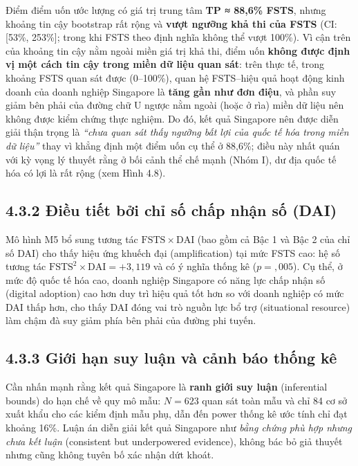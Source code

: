 \documentclass[
  a4paper,
  13pt]{extreport}
\begin{document}
Điểm điểm uốn ước lượng có giá trị trung tâm \textbf{TP ≈ 88,6\% FSTS},
nhưng khoảng tin cậy bootstrap rất rộng và \textbf{vượt ngưỡng khả thi
của FSTS} (CI: {[}53\%, 253\%{]}; trong khi FSTS theo định nghĩa không
thể vượt 100\%). Vì cận trên của khoảng tin cậy nằm ngoài miền giá trị
khả thi, điểm uốn \textbf{không được định vị một cách tin cậy trong miền
dữ liệu quan sát}: trên thực tế, trong khoảng FSTS quan sát được
(0--100\%), quan hệ FSTS--hiệu quả hoạt động kinh doanh của doanh nghiệp
Singapore là \textbf{tăng gần như đơn điệu}, và phần suy giảm bên phải
của đường chữ U ngược nằm ngoài (hoặc ở rìa) miền dữ liệu nên không được
kiểm chứng thực nghiệm. Do đó, kết quả Singapore nên được diễn giải thận
trọng là \emph{``chưa quan sát thấy ngưỡng bất lợi của quốc tế hóa trong
miền dữ liệu''} thay vì khẳng định một điểm uốn cụ thể ở 88,6\%; điều
này nhất quán với kỳ vọng lý thuyết rằng ở bối cảnh thể chế mạnh (Nhóm
I), dư địa quốc tế hóa có lợi là rất rộng (xem Hình 4.8).

\hypertarget{ux111iux1ec1u-tiux1ebft-bux1edfi-chux1ec9-sux1ed1-chux1ea5p-nhux1eadn-sux1ed1-dai}{%
\subsection{4.3.2 Điều tiết bởi chỉ số chấp nhận số
(DAI)}\label{ux111iux1ec1u-tiux1ebft-bux1edfi-chux1ec9-sux1ed1-chux1ea5p-nhux1eadn-sux1ed1-dai}}

Mô hình M5 bổ sung tương tác \(\mathrm{FSTS} \times \mathrm{DAI}\) (bao
gồm cả Bậc 1 và Bậc 2 của chỉ số DAI) cho thấy hiệu ứng khuếch đại
(amplification) tại mức FSTS cao: hệ số tương tác
\(\mathrm{FSTS}^2 \times \mathrm{DAI} = +3{,}119\) và có ý nghĩa thống
kê (\(p = {,}005\)). Cụ thể, ở mức độ quốc tế hóa cao, doanh nghiệp
Singapore có năng lực chấp nhận số (digital adoption) cao hơn duy trì
hiệu quả tốt hơn so với doanh nghiệp có mức DAI thấp hơn, cho thấy DAI
đóng vai trò nguồn lực bổ trợ (situational resource) làm chậm đà suy
giảm phía bên phải của đường phi tuyến.

\hypertarget{giux1edbi-hux1ea1n-suy-luux1eadn-vuxe0-cux1ea3nh-buxe1o-thux1ed1ng-kuxea}{%
\subsection{4.3.3 Giới hạn suy luận và cảnh báo thống
kê}\label{giux1edbi-hux1ea1n-suy-luux1eadn-vuxe0-cux1ea3nh-buxe1o-thux1ed1ng-kuxea}}

Cần nhấn mạnh rằng kết quả Singapore là \textbf{ranh giới suy luận}
(inferential bounds) do hạn chế về quy mô mẫu: \(N = 623\) quan sát toàn
mẫu và chỉ 84 cơ sở xuất khẩu cho các kiểm định mẫu phụ, dẫn đến power
thống kê ước tính chỉ đạt khoảng 16\%. Luận án diễn giải kết quả
Singapore như \emph{bằng chứng phù hợp nhưng chưa kết luận} (consistent
but underpowered evidence), không bác bỏ giả thuyết nhưng cũng không
tuyên bố xác nhận dứt khoát.
\end{document}
